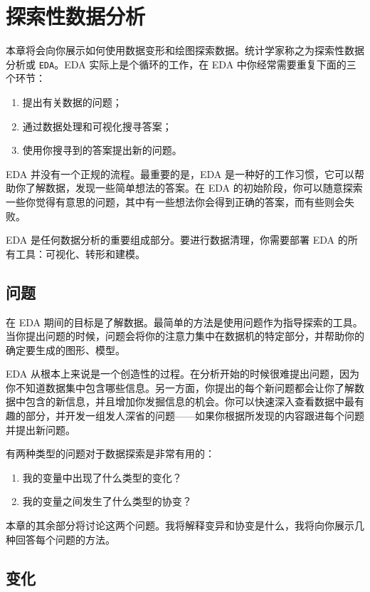 \chapter{探索性数据分析}

本章将会向你展示如何使用数据变形和绘图探索数据。统计学家称之为探索性数据分析或 \texttt{EDA}。EDA 实际上是个循环的工作，在 EDA 中你经常需要重复下面的三个环节：

\begin{enumerate}
\item 提出有关数据的问题；
\item 通过数据处理和可视化搜寻答案；
\item 使用你搜寻到的答案提出新的问题。
\end{enumerate}

EDA 并没有一个正规的流程。最重要的是，EDA 是一种好的工作习惯，它可以帮助你了解数据，发现一些简单想法的答案。在 EDA 的初始阶段，你可以随意探索一些你觉得有意思的问题，其中有一些想法你会得到正确的答案，而有些则会失败。

EDA 是任何数据分析的重要组成部分。要进行数据清理，你需要部署 EDA 的所有工具：可视化、转形和建模。

\section{问题}

在 EDA 期间的目标是了解数据。最简单的方法是使用问题作为指导探索的工具。当你提出问题的时候，问题会将你的注意力集中在数据机的特定部分，并帮助你的确定要生成的图形、模型。

EDA 从根本上来说是一个创造性的过程。在分析开始的时候很难提出问题，因为你不知道数据集中包含哪些信息。另一方面，你提出的每个新问题都会让你了解数据中包含的新信息，并且增加你发掘信息的机会。你可以快速深入查看数据中最有趣的部分，并开发一组发人深省的问题------如果你根据所发现的内容跟进每个问题并提出新问题。

有两种类型的问题对于数据探索是非常有用的：
\begin{enumerate}
  \item 我的变量中出现了什么类型的变化？
  \item 我的变量之间发生了什么类型的协变？
\end{enumerate}

本章的其余部分将讨论这两个问题。我将解释变异和协变是什么，我将向你展示几种回答每个问题的方法。

\section{变化}
